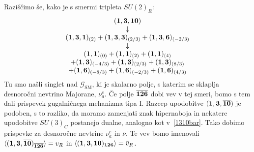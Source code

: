 Raziščimo še, kako je s smermi tripleta $SU(2)_R$:
\begin{align}
	\begin{array}{c}
		(\mathbf{1}, \mathbf{3}, \mathbf{10}) \\
		\downarrow \\
		(\mathbf{1}, \mathbf{3}, \mathbf{1})_{(2)} + (\mathbf{1}, \mathbf{3}, \mathbf{3})_{(2/3)} + (\mathbf{1}, \mathbf{3}, \mathbf{6})_{(-2/3)} \\
		\downarrow \\
		(\mathbf{1}, \mathbf{1})_{(0)} + (\mathbf{1}, \mathbf{1})_{(2)} + (\mathbf{1}, \mathbf{1})_{(4)} \\ + (\mathbf{1}, \mathbf{3})_{(-4/3)} + (\mathbf{1}, \mathbf{3})_{(2/3)} +
			(\mathbf{1}, \mathbf{3})_{(8/3)} \\ + (\mathbf{1}, \mathbf{6})_{(-8/3)} + (\mathbf{1}, \mathbf{6})_{(-2/3)} + (\mathbf{1}, \mathbf{6})_{(4/3)}
	\end{array}
\end{align}
Tu smo našli singlet nad $\mathcal{G}_\text{SM}$, ki je skalarno polje, s katerim se sklaplja
desnoročni nevtrino Majorane, $\nu^c_a$. Če polje $\overline{\mathbf{126}}$ dobi vev v tej smeri, bomo s tem dali
prispevek gugalničnega mehanizma tipa I. Razcep upodobitve $(\mathbf{1}, \mathbf{3}, \overline{\mathbf{10}})$ je podoben, s to
razliko, da moramo zamenjati znak hipernaboja in nekatere upodobitve $SU(3)_C$ postanejo dualne,
analogno kot v~\eqref{1310bar}. Tako dobimo prispevke za desnoročne nevtrine $\nu^c_a$ in $\bar{\nu}$.
Te vev bomo imenovali $\langle (\mathbf{1}, \mathbf{3}, \overline{\mathbf{10}})_{\overline{\mathbf{126}}} \rangle = v_R$ in
$\langle (\mathbf{1}, \mathbf{3}, \mathbf{10})_{\mathbf{126}} \rangle = \bar{v}_R$.

